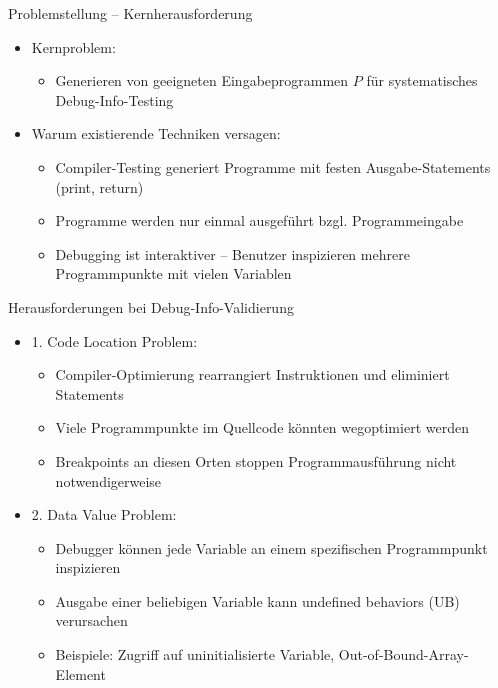 ﻿\documentclass{beamer}
\begin{document}
\begin{frame}{Problemstellung -- Kernherausforderung}
  \begin{itemize}
    \item Kernproblem:
      \begin{itemize}
        \item Generieren von geeigneten Eingabeprogrammen $P$ f\"ur systematisches Debug-Info-Testing
      \end{itemize}
    \vspace{0.5cm}
    \item Warum existierende Techniken versagen:
      \begin{itemize}
        \item Compiler-Testing generiert Programme mit festen Ausgabe-Statements (print, return)
        \item Programme werden nur einmal ausgef\"uhrt bzgl. Programmeingabe
        \item Debugging ist interaktiver -- Benutzer inspizieren mehrere Programmpunkte mit vielen Variablen
      \end{itemize}
  \end{itemize}
\end{frame}

\begin{frame}{Herausforderungen bei Debug-Info-Validierung}
  \begin{itemize}
    \item 1. Code Location Problem:
      \begin{itemize}
        \item Compiler-Optimierung rearrangiert Instruktionen und eliminiert Statements
        \item Viele Programmpunkte im Quellcode k\"onnten wegoptimiert werden
        \item Breakpoints an diesen Orten stoppen Programmausf\"uhrung nicht notwendigerweise
      \end{itemize}
    \vspace{0.5cm}
    \item 2. Data Value Problem:
      \begin{itemize}
        \item Debugger k\"onnen jede Variable an einem spezifischen Programmpunkt inspizieren
        \item Ausgabe einer beliebigen Variable kann undefined behaviors (UB) verursachen
        \item Beispiele: Zugriff auf uninitialisierte Variable, Out-of-Bound-Array-Element
      \end{itemize}
  \end{itemize}
\end{frame}
\end{document}
